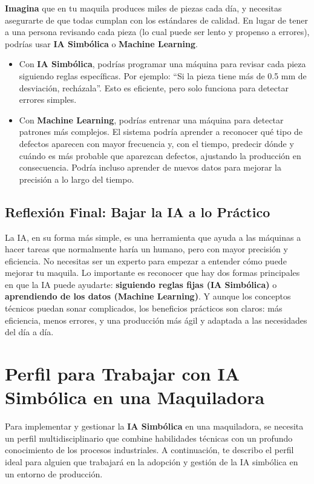 \textbf{Imagina} que en tu maquila produces miles de piezas cada día, y necesitas asegurarte de que todas cumplan con los estándares de calidad. En lugar de tener a una persona revisando cada pieza (lo cual puede ser lento y propenso a errores), podrías usar \textbf{IA Simbólica} o \textbf{Machine Learning}.

\begin{itemize}
    \item Con \textbf{IA Simbólica}, podrías programar una máquina para revisar cada pieza siguiendo reglas específicas. Por ejemplo: ``Si la pieza tiene más de 0.5 mm de desviación, recházala''. Esto es eficiente, pero solo funciona para detectar errores simples.
    \item Con \textbf{Machine Learning}, podrías entrenar una máquina para detectar patrones más complejos. El sistema podría aprender a reconocer qué tipo de defectos aparecen con mayor frecuencia y, con el tiempo, predecir dónde y cuándo es más probable que aparezcan defectos, ajustando la producción en consecuencia. Podría incluso aprender de nuevos datos para mejorar la precisión a lo largo del tiempo.
\end{itemize}

\subsection{Reflexión Final: Bajar la IA a lo Práctico}\label{reflexion-practica}

La IA, en su forma más simple, es una herramienta que ayuda a las máquinas a hacer tareas que normalmente haría un humano, pero con mayor precisión y eficiencia. No necesitas ser un experto para empezar a entender cómo puede mejorar tu maquila. Lo importante es reconocer que hay dos formas principales en que la IA puede ayudarte: \textbf{siguiendo reglas fijas (IA Simbólica)} o \textbf{aprendiendo de los datos (Machine Learning)}. Y aunque los conceptos técnicos puedan sonar complicados, los beneficios prácticos son claros: más eficiencia, menos errores, y una producción más ágil y adaptada a las necesidades del día a día.

\section{Perfil para Trabajar con IA Simbólica en una Maquiladora}\label{perfil-ia-simbolica}

Para implementar y gestionar la \textbf{IA Simbólica} en una maquiladora, se necesita un perfil multidisciplinario que combine habilidades técnicas con un profundo conocimiento de los procesos industriales. A continuación, te describo el perfil ideal para alguien que trabajará en la adopción y gestión de la IA simbólica en un entorno de producción.

